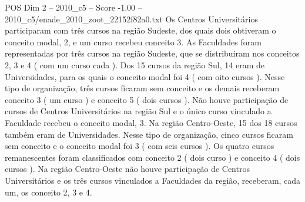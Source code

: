 \begin{textsample}{POS Dim 2 – 2010\_c5 – Score -1.00 – 2010\_c5/enade\_2010\_zoot\_22152f82a0.txt}
Os Centros Universitários participaram com três cursos na região Sudeste, dos quais dois obtiveram o conceito modal, 2, e um curso recebeu conceito 3.
As Faculdades foram representadas por três cursos na região Sudeste, que se distribuíram nos conceitos 2, 3 e 4 ( com um curso cada ).
Dos 15 cursos da região Sul, 14 eram de Universidades, para os quais o conceito modal foi 4 ( com oito cursos ).
Nesse tipo de organização, três cursos ficaram sem conceito e os demais receberam conceito 3 ( um curso ) e conceito 5 ( dois cursos ).
Não houve participação de cursos de Centros Universitários na região Sul e o único curso vinculado a Faculdade recebeu o conceito modal, 3.
Na região Centro-Oeste, 15 dos 18 cursos também eram de Universidades.
Nesse tipo de organização, cinco cursos ficaram sem conceito e o conceito modal foi 3 ( com seis cursos ).
Os quatro cursos remanescentes foram classificados com conceito 2 ( dois curso ) e conceito 4 ( dois cursos ).
Na região Centro-Oeste não houve participação de Centros Universitários e os três cursos vinculados a Faculdades da região, receberam, cada um, os conceito 2, 3 e 4.

\end{textsample}
